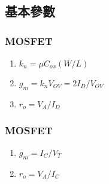 \documentclass[12pt, a4paper]{article}
\begin{document}
\subsection{基本參數}
\subsubsection{MOSFET}
\begin{enumerate}
  \item $k_n = \mu C_{ox} (W/L)$
  \item $g_m = k_n V_{OV} = 2I_D/V_{OV}$
  \item $r_o = V_A/I_D$
\end{enumerate}
\subsubsection{MOSFET}
\begin{enumerate}
  \item $g_m = I_C / V_T$
  \item $r_o = V_A / I_C$
\end{enumerate}
\end{document}
